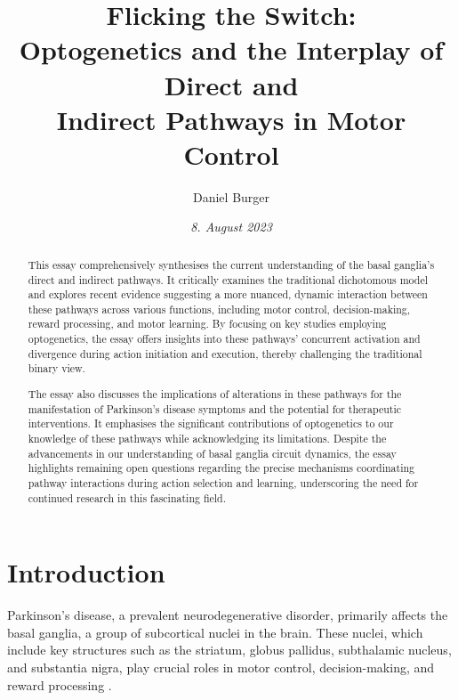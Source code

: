 \documentclass[10pt]{article}
\title{\textbf{Flicking the Switch: } \\ Optogenetics and the Interplay of Direct and \\ Indirect Pathways in Motor Control}
\author[ ]{Daniel Burger}
\affil[ ]{\textbf{King’s College London}}
\affil[ ]{\href{mailto:public@danielburger.online}{public@danielburger.online}}
\date{\textit{8. August 2023}}
\begin{document}

\maketitle
\thispagestyle{empty}


\begin{sloppypar} %
  \begin{abstract}
    This essay comprehensively synthesises the current understanding of the basal ganglia’s direct and indirect pathways. It critically examines the traditional dichotomous model and explores recent evidence suggesting a more nuanced, dynamic interaction between these pathways across various functions, including motor control, decision-making, reward processing, and motor learning. By focusing on key studies employing optogenetics, the essay offers insights into these pathways’ concurrent activation and divergence during action initiation and execution, thereby challenging the traditional binary view.

    The essay also discusses the implications of alterations in these pathways for the manifestation of Parkinson’s disease symptoms and the potential for therapeutic interventions. It emphasises the significant contributions of optogenetics to our knowledge of these pathways while acknowledging its limitations. Despite the advancements in our understanding of basal ganglia circuit dynamics, the essay highlights remaining open questions regarding the precise mechanisms coordinating pathway interactions during action selection and learning, underscoring the need for continued research in this fascinating field.
  \end{abstract}
  \pagebreak

  \tableofcontents
  \pagebreak

  \listoffigures
  \pagebreak



  \section{Introduction}
  \label{sec:introduction}

  Parkinson’s disease, a prevalent neurodegenerative disorder, primarily affects the basal ganglia, a group of subcortical nuclei in the brain. These nuclei, which include key structures such as the striatum, globus pallidus, subthalamic nucleus, and substantia nigra, play crucial roles in motor control, decision-making, and reward processing \citep{zhang_oculomotor_2018,ojagbemi_neuropsychiatric_2013}.


\end{sloppypar}
\end{document}

